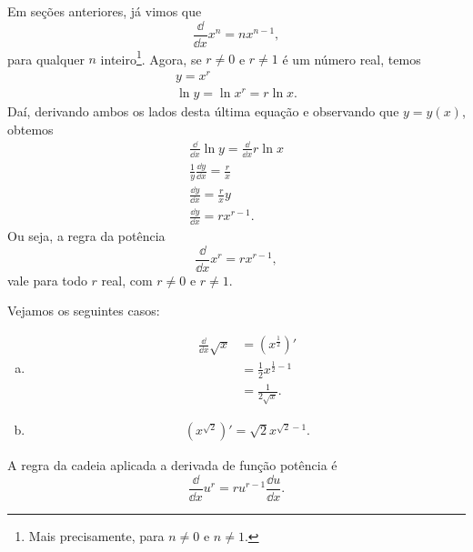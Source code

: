 \begin{obs}
  Em seções anteriores, já vimos que
  \begin{equation}
    \frac{\dd}{\dd x}x^n = nx^{n-1},
  \end{equation}
  para qualquer $n$ inteiro\footnote{Mais precisamente, para $n\neq 0$ e $n\neq 1$.}. Agora, se $r\neq 0$ e $r\neq 1$ é um número real, temos
  \begin{gather}
    y = x^r \\
    \ln y = \ln x^r = r\ln x.
  \end{gather}
  Daí, derivando ambos os lados desta última equação e observando que $y = y(x)$, obtemos
  \begin{gather}
    \frac{\dd}{\dd x} \ln y = \frac{\dd}{\dd x} r\ln x \\
    \frac{1}{y}\frac{\dd y}{\dd x} = \frac{r}{x} \\
    \frac{\dd y}{\dd x} = \frac{r}{x}y \\
    \frac{\dd y}{\dd x} = rx^{r-1}.
  \end{gather}
  Ou seja, a regra da potência
  \begin{equation}
    \frac{\dd}{\dd x}x^r = rx^{r-1},
  \end{equation}
  vale para todo $r$ real, com $r\neq 0$ e $r\neq 1$.
\end{obs}

\begin{ex}
  Vejamos os seguintes casos:
  \begin{enumerate}[a)]
  \item
    \begin{align}
      \frac{\dd}{\dd x}\sqrt{x} &= \left(x^{\frac{1}{2}}\right)' \\
                                &= \frac{1}{2}x^{\frac{1}{2}-1} \\
                                &= \frac{1}{2\sqrt{x}}.
    \end{align}
  \item
    \begin{align}
      \left(x^{\sqrt{2}}\right)' = \sqrt{2}x^{\sqrt{2}-1}.
    \end{align}
  \end{enumerate}
\end{ex}

\begin{obs}
  A regra da cadeia aplicada a derivada de função potência é
  \begin{equation}\label{eq:deriv_rcfp}
    \frac{\dd}{\dd x}u^r = ru^{r-1}\frac{\dd u}{\dd x}.
  \end{equation}
\end{obs}

